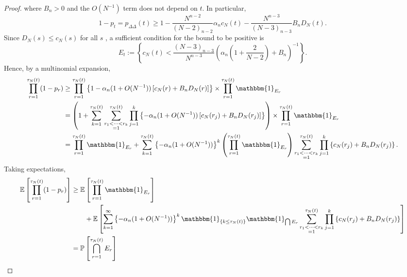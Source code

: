 \documentclass{article}
\newcommand{\Prob}{\mathbb{P}}
\newcommand{\E}{\mathbb{E}}
\newcommand{\I}[1]{\mathbbm{1}_{\{#1\}}}
\newcommand{\1}[1]{\mathbbm{1}_{#1}}
\begin{document}
\begin{proof}
where $B_n >0$ and the $O(N^{-1})$ term does not depend on $t$.
In particular,
\begin{equation}
1-p_t = p_{\Delta\Delta}(t) \geq 1 - \frac{N^{n-2}}{(N-2)_{n-2}} \alpha_n c_N(t) - \frac{N^{n-3}}{(N-3)_{n-3}} B_n D_N(t) .
\end{equation}
Since $D_N(s) \leq c_N(s)$ for all $s$ \citep[p.9]{koskela2018}, a sufficient condition for the bound to be positive is
\begin{equation}
E_t := \left\{ c_N(t) < \frac{(N-3)_{n-3}}{N^{n-3}} \left( \alpha_n \left(1 + \frac{2}{N-2} \right) + B_n \right)^{-1} \right\} .
\end{equation}
Hence, by a multinomial expansion,
\begin{align}
\prod_{r=1}^{\tau_N(t)} (1-p_r)
&\geq \prod_{r=1}^{\tau_N(t)} \left\{ 1 - \alpha_n (1+O(N^{-1}))\left[ c_N(r) + B_n D_N(r) \right] \right\}
\times \prod_{r=1}^{\tau_N(t)} \1{E_r} \notag\\
&= \left( 1 + \sum_{k=1}^{\tau_N(t)} \sum_{\substack{r_1<\dots<r_k \\ =1}}^{\tau_N(t)}\prod_{j=1}^k 
\left\{ - \alpha_n (1+O(N^{-1})) \left[ c_N(r_j) + B_n D_N(r_j) \right] \right\} \right)
\times \prod_{r=1}^{\tau_N(t)} \1{E_r} \notag\\
&= \prod_{r=1}^{\tau_N(t)} \1{E_r} 
+ \sum_{k=1}^{\tau_N(t)} \left\{- \alpha_n (1+O(N^{-1}))\right\}^k 
\left(\prod_{r=1}^{\tau_N(t)} \1{E_r} \right)
\sum_{\substack{r_1<\dots<r_k \\ =1}}^{\tau_N(t)}\prod_{j=1}^k 
\left\{ c_N(r_j) + B_n D_N(r_j) \right\} .
\end{align}
Taking expectations,
\begin{align}\label{eq:9}
\E \left[ \prod_{r=1}^{\tau_N(t)} (1-p_r) \right]
&\geq \E\left[ \prod_{r=1}^{\tau_N(t)} \1{E_r} \right] \notag\\
&\qquad + \E \left[ \sum_{k=1}^{\infty} \left\{- \alpha_n (1+O(N^{-1}))\right\}^k \I{k \leq \tau_N(t)} \1{\bigcap E_r} \sum_{\substack{r_1<\dots<r_k \\ =1}}^{\tau_N(t)}\prod_{j=1}^k 
\left\{ c_N(r_j) + B_n D_N(r_j) \right\} \right] \notag\\
&= \Prob \left[ \bigcap_{r=1}^{\tau_N(t)} E_r \right] \notag\\

\end{align}
\end{proof}
\end{document}
